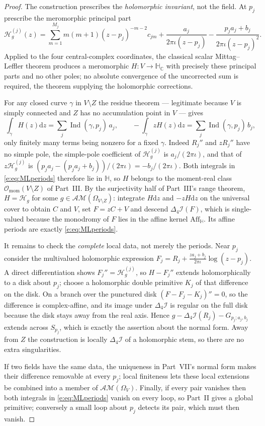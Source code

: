 \documentclass[11pt,a4paper]{article}
\numberwithin{equation}{section}
\theoremstyle{definition}
\theoremstyle{remark}
\theoremstyle{plain}
\newcommand{\HH}{\mathbb H}
\newcommand{\HC}{\mathbb H_{\mathbb C}}
\DeclareMathOperator{\Ind}{Ind}
\newcommand{\lap}{\Delta_4}
\newcommand{\I}{\mathcal I}
\newcommand{\AM}{\mathcal{AM}}
\newcommand{\Om}{\Omega}
\newcommand{\Aff}{\mathrm{Aff}_{\HH}}
\newcommand{\Omom}{\mathcal O_{\mathrm{mom}}}
\newcommand{\pot}{C}          %
\newcommand{\potV}{V}         %
\newcommand{\Hg}{\mathcal H_{g}}      %
\newcommand{\dd}{\mathrm d}
\begin{document}
\begin{proof}
The construction prescribes the \emph{holomorphic invariant}, not the
field. At $p_j$ prescribe the meromorphic principal part
\begin{equation}
 \Hg^{(j)}(z)=
 \sum_{m=1}^{M_j}m(m+1)(z-p_j)^{-m-2}c_{jm}
 +\frac{a_j}{2\pi\iota(z-p_j)}
 -\frac{p_ja_j+b_j}{2\pi\iota(z-p_j)^2}.
 \label{e:eq:MLdata}
\end{equation}
Applied to the four central-complex coordinates, the classical scalar
Mittag--Leffler theorem produces a meromorphic $H:V\to\HC$ with precisely
these principal parts and no other poles; no absolute convergence of the
uncorrected sum is required, the theorem supplying the holomorphic
corrections.

For any closed curve $\gamma$ in $V\setminus Z$ the residue theorem ---
legitimate because $V$ is simply connected and $Z$ has no accumulation
point in $V$ --- gives
\begin{equation}
 \int_\gamma H(z)\dd z=\sum_j\Ind(\gamma,p_j)\,a_j,
 \qquad
 -\int_\gamma zH(z)\dd z=\sum_j\Ind(\gamma,p_j)\,b_j,
 \label{e:eq:MLperiods}
\end{equation}
only finitely many terms being nonzero for a fixed $\gamma$. Indeed
$R_j''$ and $zR_j''$ have no simple pole, the simple-pole coefficient of
$\Hg^{(j)}$ is $a_j/(2\pi\iota)$, and that of $z\Hg^{(j)}$ is
$(p_ja_j-(p_ja_j+b_j))/(2\pi\iota)=-b_j/(2\pi\iota)$. Both integrals in
\eqref{e:eq:MLperiods} therefore lie in $\HH$, so $H$ belongs to the
moment-real class $\Omom(V\setminus Z)$ of Part~III. By the surjectivity
half of Part~III's range theorem, $H=\Hg$ for some
$g\in\AM(\Om_{V\setminus Z})$: integrate $H\dd z$ and $-zH\dd z$ on the
universal cover to obtain $\pot$ and $\potV$, set $F=z\pot+\potV$ and
descend $\lap\I(F)$, which is single-valued because the monodromy of $F$
lies in the affine kernel $\Aff$. Its affine periods are exactly
\eqref{e:eq:MLperiods}.

It remains to check the \emph{complete} local data, not merely the
periods. Near $p_j$ consider the multivalued holomorphic expression
$F_j=R_j+\frac{za_j+b_j}{2\pi\iota}\log(z-p_j)$. A direct
differentiation shows $F_j''=\Hg^{(j)}$, so $H-F_j''$ extends
holomorphically to a disk about $p_j$; choose a holomorphic double
primitive $K_j$ of that difference on the disk. On a branch over the
punctured disk $(F-F_j-K_j)''=0$, so the difference is complex-affine,
and its image under $\lap\I$ is regular on the full disk because the
disk stays away from the real axis. Hence
$g-\lap\I(R_j)-G_{p_j;a_j,b_j}$ extends across $S_{p_j}$, which is
exactly the assertion about the normal form. Away from $Z$ the
construction is locally $\lap\I$ of a holomorphic stem, so there are no
extra singularities.

If two fields have the same data, the uniqueness in Part~VII's normal
form makes their difference removable at every $p_j$; local finiteness
lets these local extensions be combined into a member of $\AM(\Om_V)$.
Finally, if every pair vanishes then both integrals in
\eqref{e:eq:MLperiods} vanish on every loop, so Part~II gives a global
primitive; conversely a small loop about $p_j$ detects its pair, which
must then vanish.
\end{proof}
\end{document}
